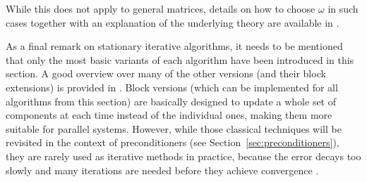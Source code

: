\noindent While this does not apply to general matrices, details on how to choose $\omega$ in such cases together with an explanation of the underlying theory are available in \cite{greenbaum_iterative_1997}.

As a final remark on stationary iterative algorithms, it needs to be mentioned that only the most basic variants of each algorithm have been introduced in this section. A good overview over many of the other versions (and their block extensions) is provided in \cite{saad_iterative_2003}. Block versions (which can be implemented for all algorithms from this section) are basically designed to update a whole set of components at each time instead of the individual ones, making them more suitable for parallel systems. However, while those classical techniques will be revisited in the context of preconditioners (see Section~\hyperref[sec:preconditioners]{\ref{sec:preconditioners}}), they are rarely used as iterative methods in practice, because the error decays too slowly and many iterations are needed before they achieve convergence \cite{strang_introduction_2009}.




